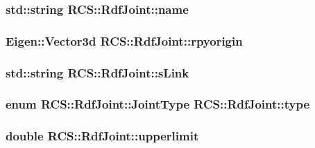 \hypertarget{structRCS_1_1RdfJoint_a3748d3036414a31ffd0cd77ff0b846fa}{
\subsubsection[{name}]{\setlength{\rightskip}{0pt plus 5cm}std\-::string R\-C\-S\-::\-Rdf\-Joint\-::name}}\label{structRCS_1_1RdfJoint_a3748d3036414a31ffd0cd77ff0b846fa}
\hypertarget{structRCS_1_1RdfJoint_a52525c53ffa8ce0c72a3720d68a13056}{
\subsubsection[{rpyorigin}]{\setlength{\rightskip}{0pt plus 5cm}Eigen\-::\-Vector3d R\-C\-S\-::\-Rdf\-Joint\-::rpyorigin}}\label{structRCS_1_1RdfJoint_a52525c53ffa8ce0c72a3720d68a13056}
\hypertarget{structRCS_1_1RdfJoint_a85cde3a02210336c5ab32c55d31da114}{
\subsubsection[{s\-Link}]{\setlength{\rightskip}{0pt plus 5cm}std\-::string R\-C\-S\-::\-Rdf\-Joint\-::s\-Link}}\label{structRCS_1_1RdfJoint_a85cde3a02210336c5ab32c55d31da114}
\hypertarget{structRCS_1_1RdfJoint_a7f6e07b79084eff50b23c31973da0276}{
\subsubsection[{type}]{\setlength{\rightskip}{0pt plus 5cm}enum {\bf R\-C\-S\-::\-Rdf\-Joint\-::\-Joint\-Type}  R\-C\-S\-::\-Rdf\-Joint\-::type}}\label{structRCS_1_1RdfJoint_a7f6e07b79084eff50b23c31973da0276}
\hypertarget{structRCS_1_1RdfJoint_af7b741b9f2d771dc519472102538b935}{
\subsubsection[{upperlimit}]{\setlength{\rightskip}{0pt plus 5cm}double R\-C\-S\-::\-Rdf\-Joint\-::upperlimit}}\label{structRCS_1_1RdfJoint_af7b741b9f2d771dc519472102538b935}
